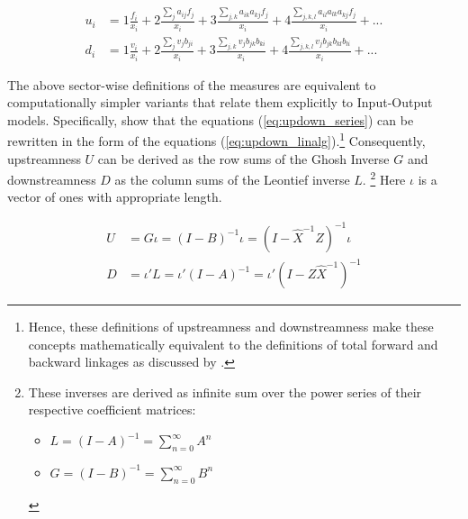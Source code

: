 \begin{equation}
    \label{eq:updown_series}
    \begin{split}
        u_i &= 1 \frac{f_i}{x_i} + 2 \frac{\sum_{j} a_{ij} f_j}{x_i} + 3 \frac{\sum_{j,k} a_{ik} a_{kj} f_j}{x_i} + 4 \frac{\sum_{j,k,l} a_{il} a_{lk} a_{kj} f_j}{x_i} + ...\\
        d_i &= 1 \frac{v_i}{x_i} + 2 \frac{\sum_{j} v_j b_{ji}}{x_i} + 3 \frac{\sum_{j,k} v_j b_{jk} b_{ki}}{x_i} + 4 \frac{\sum_{j,k,l} v_j b_{jk} b_{kl} b_{li}}{x_i} + ...
    \end{split}
\end{equation}

The above sector-wise definitions of the measures are equivalent to computationally simpler variants that relate them explicitly to 
Input-Output models. Specifically, \textcite[451-453]{miller2017OutputUpstreamnessInput} show that the equations 
(\ref{eq:updown_series}) can be rewritten in the form of the equations (\ref{eq:updown_linalg}).\footnote{Hence, these definitions of 
upstreamness and downstreamness make these concepts mathematically equivalent to the definitions of total forward and backward linkages
as discussed by \textcite[555-558]{miller2009InputoutputAnalysisFoundations}.} Consequently, upstreamness $U$ can be 
derived as the row sums of the Ghosh Inverse $G$ and downstreamness $D$ as the column sums of the Leontief inverse $L$.
\footnote{These inverses are derived as infinite sum over the power series of their respective coefficient matrices: \begin{itemize}
    \item $L = (I - A)^{-1} = \sum_{n=0}^{\infty} A^n$
    \item $G = (I - B)^{-1} = \sum_{n=0}^{\infty} B^n$
\end{itemize}} Here $\iota$ is a vector of ones with appropriate length.

\begin{equation}
    \label{eq:updown_linalg}
    \begin{split}
        U &=  G \iota = (I - B)^{-1} \iota = (I - \hat{X}^{-1} Z)^{-1} \iota\\
        D &= \iota'L = \iota' (I - A)^{-1} = \iota' (I - Z \hat{X}^{-1})^{-1}
    \end{split}
\end{equation}

